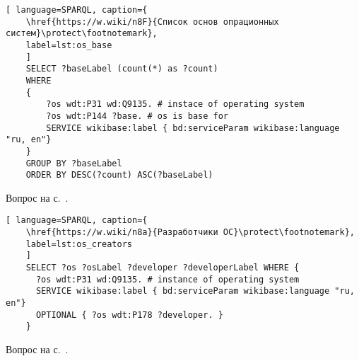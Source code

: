 \begin{task}
	\label{answer:os_base}
	
	\begin{lstlisting}[ language=SPARQL, caption={
	\href{https://w.wiki/n8F}{Список основ опрационных систем}\protect\footnotemark},
	label=lst:os_base
	]
	SELECT ?baseLabel (count(*) as ?count)
	WHERE
	{
		?os wdt:P31 wd:Q9135. # instace of operating system
		?os wdt:P144 ?base. # os is base for
		SERVICE wikibase:label { bd:serviceParam wikibase:language "ru, en"}
	}
	GROUP BY ?baseLabel
	ORDER BY DESC(?count) ASC(?baseLabel)
	\end{lstlisting}
	
	\small{Вопрос на с.~\pageref{lst:base_of_operating_systems}.}
\end{task}

\begin{task}
	\label{answer:what_system_created}
	
	\begin{lstlisting}[ language=SPARQL, caption={
	\href{https://w.wiki/n8a}{Разработчики ОС}\protect\footnotemark},
	label=lst:os_creators
	]
	SELECT ?os ?osLabel ?developer ?developerLabel WHERE {
	  ?os wdt:P31 wd:Q9135. # instance of operating system
	  SERVICE wikibase:label { bd:serviceParam wikibase:language "ru, en"}
	  OPTIONAL { ?os wdt:P178 ?developer. }
	}
	\end{lstlisting}
	
	\small{Вопрос на с.~\pageref{lst:inception_time_of_operating_systems}.}
\end{task}


